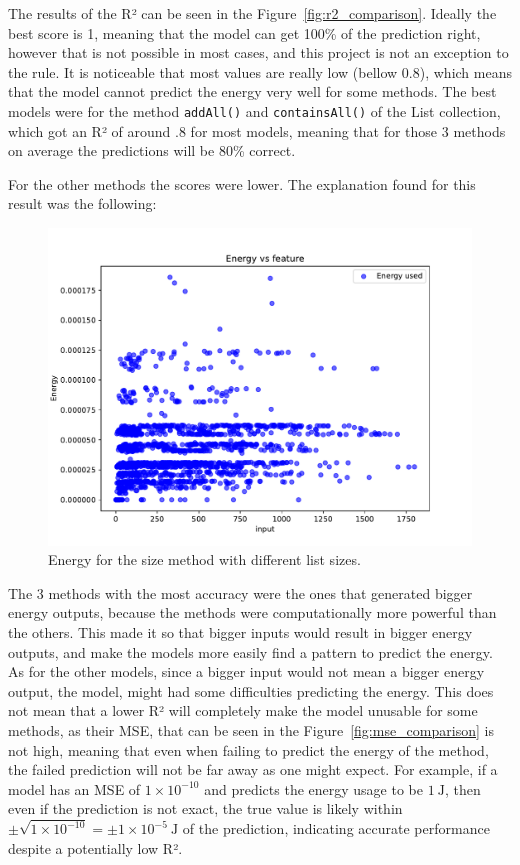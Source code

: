 The results of the R² can be seen in the Figure~\ref{fig:r2_comparison}.
Ideally the best score is 1, meaning that the model can get 100\% of the prediction right, however that is not possible in most cases, and this project is not an exception to the rule. It is noticeable that most values are really low (bellow 0.8), which means that the model cannot predict the energy very well for some methods. The best models were for the method \texttt{addAll()} and \texttt{containsAll()} of the List collection, which got an R² of around .8 for most models, meaning that for those 3 methods on average the predictions will be 80\% correct.

For the other methods the scores were lower. The explanation found for this result was the following:


\begin{figure}[htbp]
  \centering
  \includegraphics[width = .8 \textwidth]{figures/size_energy.pdf}
  \caption{Energy for the size method with different list sizes.}
  \label{fig:size_energy}
\end{figure}

The 3 methods with the most accuracy were the ones that generated bigger energy outputs, because the methods were computationally more powerful than the others. This made it so that bigger inputs would result in bigger energy outputs, and make the models more easily find a pattern to predict the energy. As for the other models, since a bigger input would not mean a bigger energy output, the model, might had some difficulties predicting the energy. This does not mean that a lower R² will completely make the model unusable for some methods, as their MSE, that can be seen in the Figure~\ref{fig:mse_comparison} is not high, meaning that even when failing to predict the energy of the method, the failed prediction will not be far away as one might expect. For example, if a model has an MSE of $1 \times 10^{-10}$ and predicts the energy usage to be $1~\mathrm{J}$, then even if the prediction is not exact, the true value is likely within $\pm \sqrt{1 \times 10^{-10}} = \pm 1 \times 10^{-5}~\mathrm{J}$ of the prediction, indicating accurate performance despite a potentially low R². 

